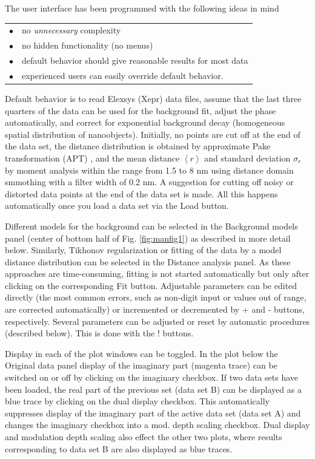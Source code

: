 \documentclass{article}
\begin{document}
The user interface has been programmed with the following ideas in mind

\begin{tabular}{ll}
\noalign{\smallskip}
$\bullet$ & no {\em unnecessary} complexity \\
$\bullet$ & no hidden functionality (no menus) \\
$\bullet$ & default behavior should give reasonable results for most data \\
$\bullet$ & experienced users can easily override default behavior. \\
\end{tabular}


Default behavior is to read Elexsys (Xepr) data files, assume that the last three quarters of the data can be used for the background fit, adjust the phase automatically, and correct for exponential background decay (homogeneous spatial distribution of nanoobjects). Initially, no points are cut off at the end of the data set, the distance distribution is obtained by approximate Pake transformation (APT) \cite{jeschke2001}, and the mean distance $\left\langle r \right\rangle$ and standard deviation $\sigma_{r}$ by moment analysis within the range from 1.5 to 8 nm using distance domain smmothing with a filter width of 0.2 nm. A suggestion for cutting off noisy or distorted data points at the end of the data set is made. All this happens automatically once you load a data set via the {\ttfamily Load} button.

Different models for the background can be selected in the {\ttfamily Background models} panel (center of bottom half of Fig. \ref{fig:manfig1}) as described in more detail below. Similarly, Tikhonov regularization or fitting of the data by a model distance distribution can be selected in the {\ttfamily Distance analysis} panel. As these approaches are time-consuming, fitting is not started automatically but only after clicking on the corresponding {\ttfamily Fit} button. Adjustable parameters can be edited directly (the most common errors, such as non-digit input or values out of range, are corrected automatically) or incremented or decremented by {\ttfamily +} and {\ttfamily -} buttons, respectively. Several parameters can be adjusted or reset by automatic procedures (described below). This is done with the {\ttfamily !} buttons.

Display in each of the plot windows can be toggled. In the plot below the {\ttfamily Original data} panel display of the imaginary part (magenta trace) can be switched on or off by clicking on the {\ttfamily imaginary} checkbox. If two data sets have been loaded, the real part of the previous set (data set B) can be displayed as a blue trace by clicking on the {\ttfamily dual display} checkbox. This automatically suppresses display of the imaginary part of the active data set (data set A) and changes the {\ttfamily imaginary} checkbox into a {\ttfamily mod. depth scaling} checkbox. Dual display and modulation depth scaling also effect the other two plots, where results corresponding to data set B are also displayed as blue traces.
\end{document}
